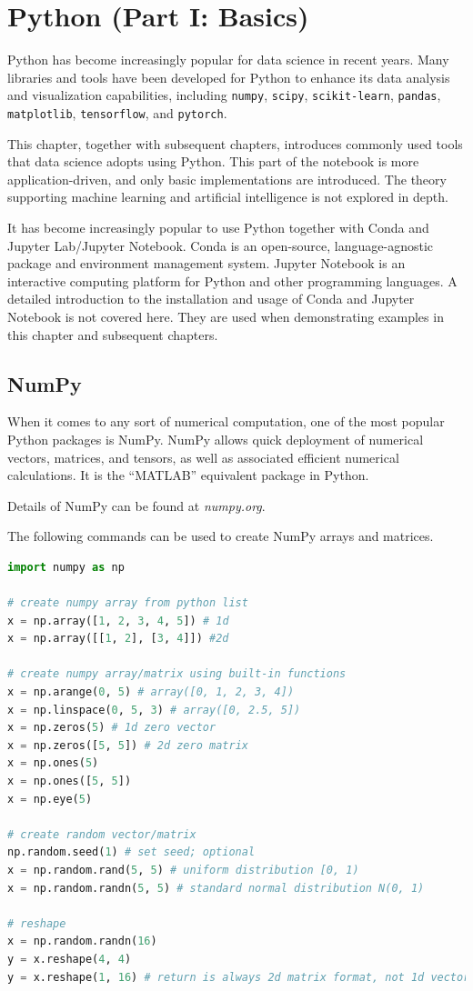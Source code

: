 \chapter{Python (Part I: Basics)} \label{ch:numpyscipy}

Python has become increasingly popular for data science in recent years. Many libraries and tools have been developed for Python to enhance its data analysis and visualization capabilities, including \verb|numpy|, \verb|scipy|, \verb|scikit-learn|, \verb|pandas|, \verb|matplotlib|, \verb|tensorflow|, and \verb|pytorch|.

This chapter, together with subsequent chapters, introduces commonly used tools that data science adopts using Python. This part of the notebook is more application-driven, and only basic implementations are introduced. The theory supporting machine learning and artificial intelligence is not explored in depth.

It has become increasingly popular to use Python together with Conda and Jupyter Lab/Jupyter Notebook. Conda is an open-source, language-agnostic package and environment management system. Jupyter Notebook is an interactive computing platform for Python and other programming languages. A detailed introduction to the installation and usage of Conda and Jupyter Notebook is not covered here. They are used when demonstrating examples in this chapter and subsequent chapters.

\section{NumPy}

When it comes to any sort of numerical computation, one of the most popular Python packages is NumPy. NumPy allows quick deployment of numerical vectors, matrices, and tensors, as well as associated efficient numerical calculations. It is the ``MATLAB'' equivalent package in Python.

Details of NumPy can be found at \textit{numpy.org}.

The following commands can be used to create NumPy arrays and matrices.
\begin{lstlisting}[language=Python]
import numpy as np

# create numpy array from python list
x = np.array([1, 2, 3, 4, 5]) # 1d
x = np.array([[1, 2], [3, 4]]) #2d

# create numpy array/matrix using built-in functions
x = np.arange(0, 5) # array([0, 1, 2, 3, 4])
x = np.linspace(0, 5, 3) # array([0, 2.5, 5])
x = np.zeros(5) # 1d zero vector
x = np.zeros([5, 5]) # 2d zero matrix
x = np.ones(5)
x = np.ones([5, 5])
x = np.eye(5)

# create random vector/matrix
np.random.seed(1) # set seed; optional
x = np.random.rand(5, 5) # uniform distribution [0, 1)
x = np.random.randn(5, 5) # standard normal distribution N(0, 1)

# reshape
x = np.random.randn(16)
y = x.reshape(4, 4)
y = x.reshape(1, 16) # return is always 2d matrix format, not 1d vector format
\end{lstlisting}

